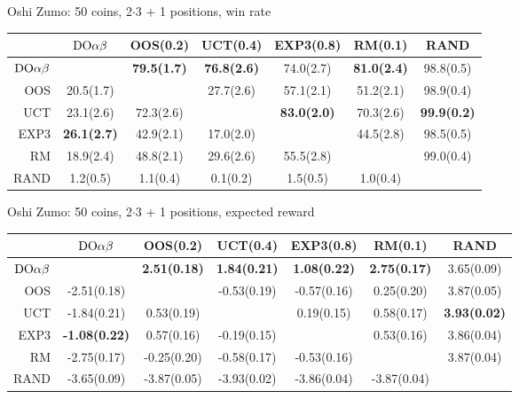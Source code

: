 \begin{table}[t!]
\centering
\begin{scriptsize}

Oshi Zumo: 50 coins, 2$\cdot$3 + 1 positions, win rate
\begin{tabular}{|r|cccccc|}\hline
&$\textrm{DO}\alpha\beta$&OOS(0.2)&UCT(0.4)&EXP3(0.8)&RM(0.1)&RAND\\\hline
$\textrm{DO}\alpha\beta$&&\textbf{79.5(1.7)}&\textbf{76.8(2.6)}&74.0(2.7)&\textbf{81.0(2.4)}&98.8(0.5)\\
OOS&20.5(1.7)&&27.7(2.6)&57.1(2.1)&51.2(2.1)&98.9(0.4)\\
UCT&23.1(2.6)&72.3(2.6)&&\textbf{83.0(2.0)}&70.3(2.6)&\textbf{99.9(0.2)}\\
EXP3&\textbf{26.1(2.7)}&42.9(2.1)&17.0(2.0)&&44.5(2.8)&98.5(0.5)\\
RM&18.9(2.4)&48.8(2.1)&29.6(2.6)&55.5(2.8)&&99.0(0.4)\\
RAND&1.2(0.5)&1.1(0.4)&0.1(0.2)&1.5(0.5)&1.0(0.4)&\\
\hline
\end{tabular}

Oshi Zumo: 50 coins, 2$\cdot$3 + 1 positions, expected reward
\begin{tabular}{|r|cccccc|}\hline
&$\textrm{DO}\alpha\beta$&OOS(0.2)&UCT(0.4)&EXP3(0.8)&RM(0.1)&RAND\\\hline
$\textrm{DO}\alpha\beta$&&\textbf{2.51(0.18)}&\textbf{1.84(0.21)}&\textbf{1.08(0.22)}&\textbf{2.75(0.17)}&3.65(0.09)\\
OOS&-2.51(0.18)&&-0.53(0.19)&-0.57(0.16)&0.25(0.20)&3.87(0.05)\\
UCT&-1.84(0.21)&0.53(0.19)&&0.19(0.15)&0.58(0.17)&\textbf{3.93(0.02)}\\
EXP3&\textbf{-1.08(0.22)}&0.57(0.16)&-0.19(0.15)&&0.53(0.16)&3.86(0.04)\\
RM&-2.75(0.17)&-0.25(0.20)&-0.58(0.17)&-0.53(0.16)&&3.87(0.04)\\
RAND&-3.65(0.09)&-3.87(0.05)&-3.93(0.02)&-3.86(0.04)&-3.87(0.04)&\\
\hline
\end{tabular}


\end{scriptsize}
\end{table}
